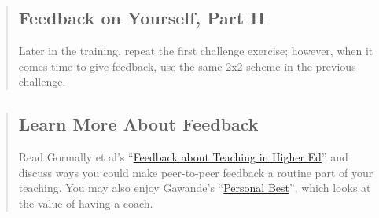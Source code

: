 \begin{quotation}   %
\subsection*{Feedback on Yourself, Part II}

Later in the training,
repeat the first challenge exercise; however, when it comes time to give feedback,
use the same 2x2 scheme in the previous challenge.
\end{quotation}   %

\begin{quotation}   %
\subsection*{Learn More About Feedback}

Read Gormally et al's ``\href{\{\{ page.root \}\}/files/papers/gormally-teaching-feedback-2014.pdf}{Feedback about Teaching in Higher Ed}''
and discuss ways you could make peer-to-peer feedback
a routine part of your teaching.
You may also enjoy Gawande's ``\href{http://www.newyorker.com/magazine/2011/10/03/personal-best}{Personal Best}'',
which looks at the value of having a coach.
\end{quotation}   %
